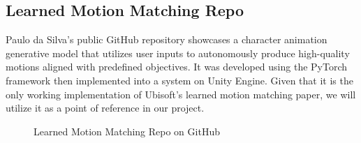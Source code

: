 \documentclass[12pt]{book}
\begin{document}
\subsection{Learned Motion Matching Repo} 
Paulo da Silva's \cite{Repo} public GitHub repository showcases a character animation generative model that utilizes user inputs to autonomously produce high-quality motions aligned with predefined objectives. It was developed using the PyTorch framework then implemented into a system on Unity Engine. 
Given that it is the only working implementation of Ubisoft's learned motion matching paper, we will utilize it as a point of reference in our project.
  \begin{figure}[!h]
    \centering
    \caption{Learned Motion Matching Repo on GitHub}
  \end{figure}
   
\newpage


\end{document}
